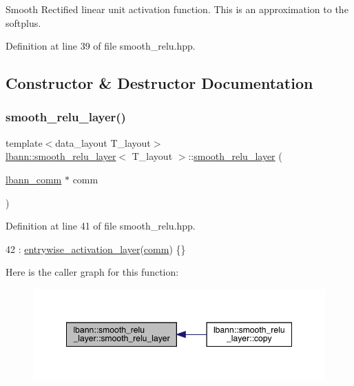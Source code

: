 Smooth Rectified linear unit activation function. This is an approximation to the softplus. 

Definition at line 39 of file smooth\+\_\+relu.\+hpp.



\subsection{Constructor \& Destructor Documentation}
\mbox{\label{classlbann_1_1smooth__relu__layer_aa045764ef0113d8516ddf95a3b810ce0}} 
\subsubsection{\texorpdfstring{smooth\+\_\+relu\+\_\+layer()}{smooth\_relu\_layer()}}
{\footnotesize\ttfamily template$<$data\+\_\+layout T\+\_\+layout$>$ \\
\hyperlink{classlbann_1_1smooth__relu__layer}{lbann\+::smooth\+\_\+relu\+\_\+layer}$<$ T\+\_\+layout $>$\+::\hyperlink{classlbann_1_1smooth__relu__layer}{smooth\+\_\+relu\+\_\+layer} (\begin{DoxyParamCaption}\item[{\hyperlink{classlbann_1_1lbann__comm}{lbann\+\_\+comm} $\ast$}]{comm }\end{DoxyParamCaption})\hspace{0.3cm}{\ttfamily [inline]}}



Definition at line 41 of file smooth\+\_\+relu.\+hpp.


\begin{DoxyCode}
42     : \hyperlink{classlbann_1_1entrywise__activation__layer_aada1d9200612dcd13259799ef327c557}{entrywise\_activation\_layer}(\hyperlink{file__io_8cpp_ab048c6f9fcbcfaa57ce68b00263dbebe}{comm}) \{\}
\end{DoxyCode}
Here is the caller graph for this function\+:\nopagebreak
\begin{figure}[H]
\begin{center}
\leavevmode
\includegraphics[width=348pt]{classlbann_1_1smooth__relu__layer_aa045764ef0113d8516ddf95a3b810ce0_icgraph}
\end{center}
\end{figure}


